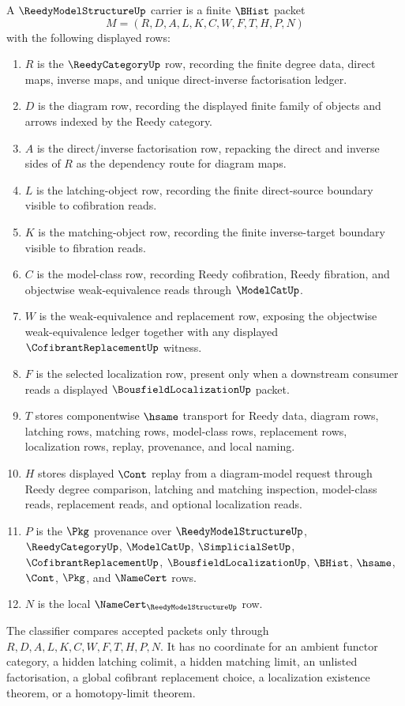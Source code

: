 \begin{definition}
\label{def:reedy-model-structure-carrier}
A $\ReedyModelStructureUp$ carrier is a finite $\BHist$ packet
$$
M=(R,D,A,L,K,C,W,F,T,H,P,N)
$$
with the following displayed rows:
\begin{enumerate}
\item $R$ is the $\ReedyCategoryUp$ row, recording the finite degree data, direct maps, inverse maps, and unique direct-inverse factorisation ledger.
\item $D$ is the diagram row, recording the displayed finite family of objects and arrows indexed by the Reedy category.
\item $A$ is the direct/inverse factorisation row, repacking the direct and inverse sides of $R$ as the dependency route for diagram maps.
\item $L$ is the latching-object row, recording the finite direct-source boundary visible to cofibration reads.
\item $K$ is the matching-object row, recording the finite inverse-target boundary visible to fibration reads.
\item $C$ is the model-class row, recording Reedy cofibration, Reedy fibration, and objectwise weak-equivalence reads through $\ModelCatUp$.
\item $W$ is the weak-equivalence and replacement row, exposing the objectwise weak-equivalence ledger together with any displayed $\CofibrantReplacementUp$ witness.
\item $F$ is the selected localization row, present only when a downstream consumer reads a displayed $\BousfieldLocalizationUp$ packet.
\item $T$ stores componentwise $\hsame$ transport for Reedy data, diagram rows, latching rows, matching rows, model-class rows, replacement rows, localization rows, replay, provenance, and local naming.
\item $H$ stores displayed $\Cont$ replay from a diagram-model request through Reedy degree comparison, latching and matching inspection, model-class reads, replacement reads, and optional localization reads.
\item $P$ is the $\Pkg$ provenance over $\ReedyModelStructureUp$, $\ReedyCategoryUp$, $\ModelCatUp$, $\SimplicialSetUp$, $\CofibrantReplacementUp$, $\BousfieldLocalizationUp$, $\BHist$, $\hsame$, $\Cont$, $\Pkg$, and $\NameCert$ rows.
\item $N$ is the local $\NameCert_{\ReedyModelStructureUp}$ row.
\end{enumerate}
The classifier compares accepted packets only through $R,D,A,L,K,C,W,F,T,H,P,N$. It has no coordinate for an ambient functor category, a hidden latching colimit, a hidden matching limit, an unlisted factorisation, a global cofibrant replacement choice, a localization existence theorem, or a homotopy-limit theorem.
\end{definition}

